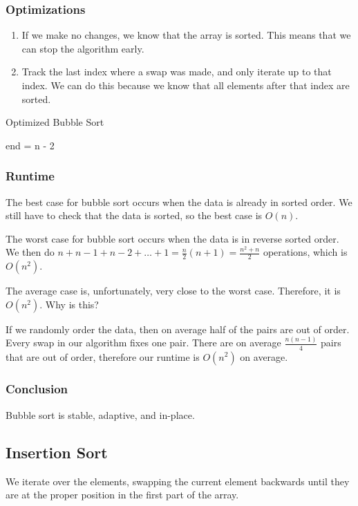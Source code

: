 \subsubsection{Optimizations}
\begin{enumerate}
	\item If we make no changes, we know that the array is sorted. This means that we can stop the algorithm early.
	\item Track the last index where a swap was made, and only iterate up to that index. We can do this because we know that all elements after that index are sorted.
\end{enumerate}

\begin{algorithm}
	\caption{Optimized Bubble Sort}
	end = n - 2\;
\end{algorithm}

\subsubsection{Runtime}
The best case for bubble sort occurs when the data is already in sorted order. We still have to check that the data is sorted, so the best case is \( O(n) \).

The worst case for bubble sort occurs when the data is in reverse sorted order. We then do \( n + n - 1 + n - 2 + \ldots + 1 = \frac{n}{2}(n+1) = \frac{n^2 + n}{2}\) operations, which is \( O(n^2) \).

The average case is, unfortunately, very close to the worst case. Therefore, it is \( O(n^2) \). Why is this?

If we randomly order the data, then on average half of the pairs are out of order. Every swap in our algorithm fixes one pair. There are on average \( \frac{n(n-1)}{4} \) pairs that are out of order, therefore our runtime is \( O(n^2) \) on average.

\subsubsection{Conclusion}
Bubble sort is stable, adaptive, and in-place.

\subsection{Insertion Sort}
We iterate over the elements, swapping the current element backwards until they are at the proper position in the first part of the array.

